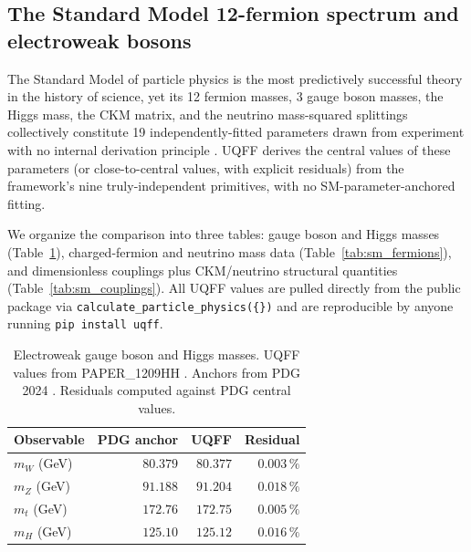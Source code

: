 
\subsection{The Standard Model 12-fermion spectrum and electroweak bosons}
\label{sec:sm_spectrum}

The Standard Model of particle physics is the most predictively
successful theory in the history of science, yet its 12 fermion masses,
3 gauge boson masses, the Higgs mass, the CKM matrix, and the neutrino
mass-squared splittings collectively constitute 19 independently-fitted
parameters drawn from experiment with no internal derivation principle
\cite{PDG2024, Tanabashi2018}. UQFF derives the central values of these
parameters (or close-to-central values, with explicit residuals) from
the framework's nine truly-independent primitives, with no
SM-parameter-anchored fitting.

We organize the comparison into three tables: gauge boson and Higgs
masses (Table~\ref{tab:sm_bosons}), charged-fermion and neutrino mass
data (Table~\ref{tab:sm_fermions}), and dimensionless couplings plus
CKM/neutrino structural quantities (Table~\ref{tab:sm_couplings}). All
UQFF values are pulled directly from the public package via
\verb|calculate_particle_physics({})| and are reproducible by anyone
running \verb|pip install uqff|.

\begin{table}[H]
\centering
\caption{Electroweak gauge boson and Higgs masses. UQFF values
from PAPER\_1209HH \cite{Murphy_PAPER_1209HH}. Anchors from
PDG 2024 \cite{PDG2024}. Residuals computed against PDG central values.}
\label{tab:sm_bosons}
\begin{tabular}{l r r r}
\toprule
\textbf{Observable} & \textbf{PDG anchor} & \textbf{UQFF} & \textbf{Residual} \\
\midrule
$m_W$ (GeV)   & $80.379$  & $80.377$  & $0.003\,\%$ \\
$m_Z$ (GeV)   & $91.188$  & $91.204$  & $0.018\,\%$ \\
$m_t$ (GeV)   & $172.76$  & $172.75$  & $0.005\,\%$ \\
$m_H$ (GeV)   & $125.10$  & $125.12$  & $0.016\,\%$ \\
\bottomrule
\end{tabular}
\end{table}

